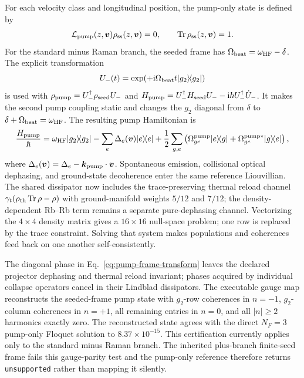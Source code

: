 \documentclass[11pt,a4paper]{article}
\newcommand{\ii}{\mathrm i}
\newcommand{\Tr}{\operatorname{Tr}}
\newcommand{\ketbra}[2]{\lvert #1\rangle\!\langle #2\rvert}
\begin{document}
For each velocity class and longitudinal position, the pump-only state is
defined by
\begin{equation}
\mathcal L_{\rm pump}(z,\bm v)\rho_{\rm ss}(z,\bm v)=0,\qquad
\Tr\rho_{\rm ss}(z,\bm v)=1 .
\label{eq:pump-nullspace}
\end{equation}
For the standard minus Raman branch, the seeded frame has
$\Omega_{\rm beat}=\omega_{\rm HF}-\delta$. The explicit transformation
\begin{equation}
U_-(t)=\exp\!\left(+\ii\Omega_{\rm beat}t\ketbra{g_2}{g_2}\right)
\label{eq:pump-frame-transform}
\end{equation}
is used with $\rho_{\rm pump}=U_-^\dagger\rho_{\rm seed}U_-$ and
$H_{\rm pump}=U_-^\dagger H_{\rm seed}U_- -\ii\hbar
U_-^\dagger\dot U_-$. It makes the second pump coupling static and changes the
$g_2$ diagonal from
$\delta$ to
$\delta+\Omega_{\rm beat}=\omega_{\rm HF}$. The resulting pump Hamiltonian is
\begin{equation}
\frac{H_{\rm pump}}{\hbar}=
\omega_{\rm HF}\ketbra{g_2}{g_2}
-\sum_e\Delta_e(\bm v)\ketbra{e}{e}
+\frac12\sum_{g,e}
\left(\Omega^{\rm pump}_{ge}\ketbra{e}{g}+\Omega^{{\rm pump}*}_{ge}\ketbra{g}{e}\right),
\label{eq:pump-hamiltonian}
\end{equation}
where $\Delta_e(\bm v)=\Delta_e-\bm k_{\rm pump}\cdot\bm v$.
Spontaneous emission, collisional optical dephasing, and ground-state
decoherence enter the same reference Liouvillian. The shared
dissipator now includes the trace-preserving thermal reload channel
$\gamma_t(\rho_{\rm th}\Tr\rho-\rho)$ with ground-manifold weights $5/12$ and
$7/12$; the density-dependent Rb--Rb term remains a separate pure-dephasing
channel. Vectorizing the
$4\times4$ density matrix gives a $16\times16$ null-space problem; one row is
replaced by the trace constraint. Solving that system makes populations
and coherences feed back on one another self-consistently.

The diagonal phase in Eq.~\eqref{eq:pump-frame-transform} leaves the declared
projector dephasing and thermal reload invariant; phases acquired by individual
collapse operators cancel in their Lindblad dissipators. The executable gauge
map reconstructs the seeded-frame pump state with $g_2$-row coherences in
$n=-1$, $g_2$-column coherences in $n=+1$, all remaining entries in $n=0$, and
all $|n|\geq2$ harmonics exactly zero. The reconstructed state agrees with the
direct $N_F=3$ pump-only Floquet solution to $8.37\times10^{-15}$. This
certification currently applies only to the standard minus Raman branch. The
inherited plus-branch finite-seed frame fails this gauge-parity test and the
pump-only reference therefore returns \texttt{unsupported} rather than mapping
it silently.
\end{document}
